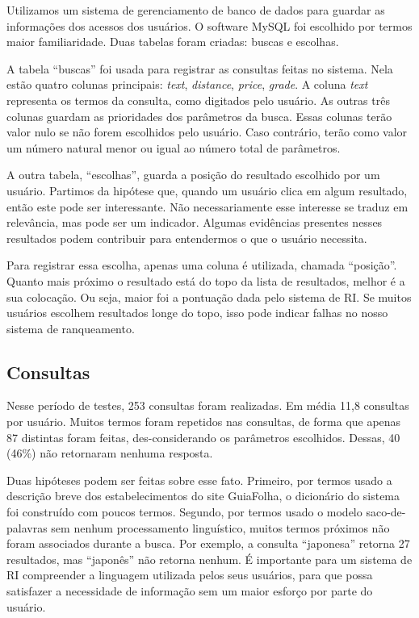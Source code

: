 Utilizamos um sistema de gerenciamento de banco de dados para guardar as informações dos acessos dos usuários. O software MySQL foi escolhido por termos maior familiaridade. Duas tabelas foram criadas: buscas e escolhas.

A tabela ``buscas'' foi usada para registrar as consultas feitas no sistema. Nela estão quatro colunas principais: \emph{text}, \emph{distance}, \emph{price}, \emph{grade}. A coluna \emph{text} representa os termos da consulta, como digitados pelo usuário. As outras três colunas guardam as prioridades dos parâmetros da busca. Essas colunas terão valor nulo se não forem escolhidos pelo usuário. Caso contrário, terão como valor um número natural menor ou igual ao número total de parâmetros.

A outra tabela, ``escolhas'', guarda a posição do resultado escolhido por um usuário. Partimos da hipótese que, quando um usuário clica em algum resultado, então este pode ser interessante. Não necessariamente esse interesse se traduz em relevância, mas pode ser um indicador. Algumas evidências presentes nesses resultados podem contribuir para entendermos o que o usuário necessita.

Para registrar essa escolha, apenas uma coluna é utilizada, chamada ``posição''. Quanto mais próximo o resultado está do topo da lista de resultados, melhor é a sua colocação. Ou seja, maior foi a pontuação dada pelo sistema de RI. Se muitos usuários escolhem resultados longe do topo, isso pode indicar falhas no nosso sistema de ranqueamento.

\subsection{Consultas}
\label{subsec:consultas}

Nesse período de testes, 253 consultas foram realizadas. Em média 11,8 consultas por usuário. Muitos termos foram repetidos nas consultas, de forma que apenas 87 distintas foram feitas, des-considerando os parâmetros escolhidos. Dessas, 40 (46\%) não retornaram nenhuma resposta.

Duas hipóteses podem ser feitas sobre esse fato. Primeiro, por termos usado a descrição breve dos estabelecimentos do site GuiaFolha, o dicionário do sistema foi construído com poucos termos. Segundo, por termos usado o modelo saco-de-palavras sem nenhum processamento linguístico, muitos termos próximos não foram associados durante a busca. Por exemplo, a consulta ``japonesa'' retorna 27 resultados, mas ``japonês'' não retorna nenhum. É importante para um sistema de RI compreender a linguagem utilizada pelos seus usuários, para que possa satisfazer a necessidade de informação sem um maior esforço por parte do usuário.

